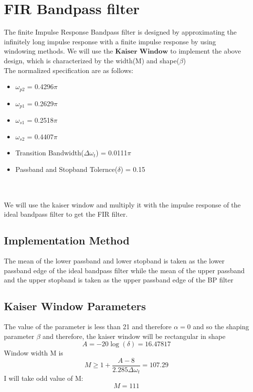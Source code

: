 \documentclass[12pt]{article}
\begin{document}
\section{FIR Bandpass filter}
The finite Impulse Response Bandpass filter is designed by approximating the infinitely long impulse response with a finite impulse response by using windowing methods. We will use the $\textbf{Kaiser Window}$ to implement the above design, which is characterized by the width(M) and shape($\beta$)\\
\newpage
The normalized specification are as follows:
\begin{itemize}
    \item 	 $\omega_{p2}$ = 0.4296$\pi$ 
    \item    $\omega_{p1}$ = 0.2629$\pi$
    \item    $\omega_{s1}$ = 0.2518$\pi$
    \item    $\omega_{s2}$ = 0.4407$\pi$
    \item    Transition Bandwidth($\Delta \omega_t$) = 0.0111$\pi$
    \item    Passband and Stopband Tolernce($\delta$) = 0.15

			
	
\end{itemize}
\\
\\
We will use the kaiser window and multiply it with the impulse response of the ideal bandpass filter to get the FIR filter.
\subsection{\textbf{Implementation Method}}
The mean of the lower passband and lower stopband is taken as the lower passband edge of the ideal bandpass filter while the mean of the upper passband and the upper stopband is taken as the upper passband edge of the BP filter
\subsection{\textbf{Kaiser Window Parameters}}
The value of the parameter is less than 21 and therefore $\alpha = 0$ and so the shaping parameter $\beta$ and therefore, the kaiser window will be rectangular in shape
\begin{equation*}
    A = -20\log(\delta) = 16.47817
\end{equation*}
Window width M is\\
\begin{equation*}
    M \geq 1+\frac{A-8}{2.285\Delta \omega_t} = 107.29
\end{equation*}
I will take odd value of M: \\
\begin{equation*}
    M = 111
\end{equation*}
\end{document}
